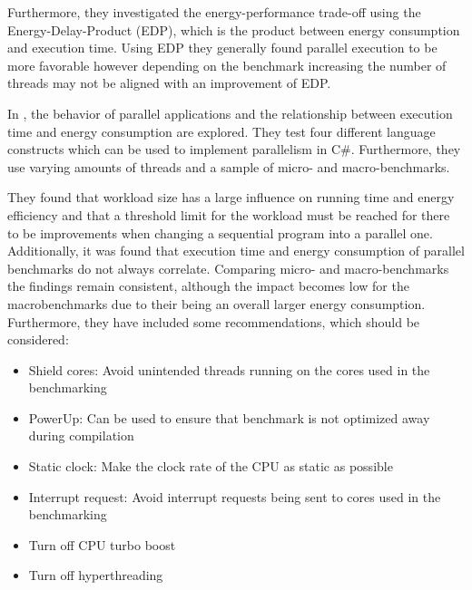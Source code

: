 Furthermore, they investigated the energy-performance trade-off using the Energy-Delay-Product (EDP), which is the product between energy consumption and execution time. Using EDP they generally found parallel execution to be more favorable however depending on the benchmark increasing the number of threads may not be aligned with an improvement of EDP.




In \cite{Lindholt}, the behavior of parallel applications and the relationship between execution time and energy consumption are explored. They test four different language constructs which can be used to implement parallelism in C\#. Furthermore, they use varying amounts of threads and a sample of micro- and macro-benchmarks. \cite{Lindholt}

They found that workload size has a large influence on running time and energy efficiency and that a threshold limit for the workload must be reached for there to be improvements when changing a sequential program into a parallel one.  Additionally, it was found that execution time and energy consumption of parallel benchmarks do not always correlate.  Comparing micro- and macro-benchmarks the findings remain consistent, although the impact becomes low for the macrobenchmarks due to their being an overall larger energy consumption. Furthermore, they have included some recommendations, which should be considered:\cite{Lindholt}

\begin{itemize}
    \item Shield cores: Avoid unintended threads running on the cores used in the benchmarking
    \item PowerUp: Can be used to ensure that benchmark is not optimized away during compilation
    \item Static clock: Make the clock rate  of the CPU as static as possible
    \item Interrupt request: Avoid interrupt requests being sent to cores used in the benchmarking 
    \item Turn off CPU turbo boost
    \item Turn off hyperthreading
\end{itemize}